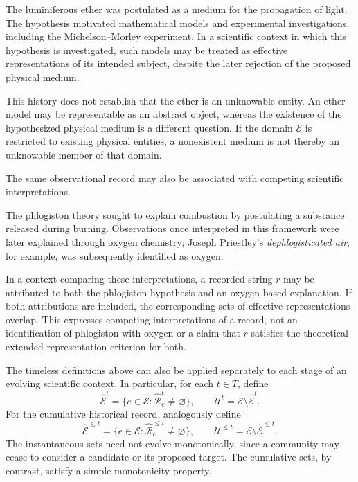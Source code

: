 \begin{example}
\label{ex:luminiferous_ether}
The luminiferous ether was postulated as a medium for the propagation of light. The hypothesis motivated mathematical models and experimental investigations, including the Michelson--Morley experiment. In a scientific context in which this hypothesis is investigated, such models may be treated as effective representations of its intended subject, despite the later rejection of the proposed physical medium.

This history does not establish that the ether is an unknowable entity. An ether model may be representable as an abstract object, whereas the existence of the hypothesized physical medium is a different question. If the domain $\mathcal E$ is restricted to existing physical entities, a nonexistent medium is not thereby an unknowable member of that domain.
\end{example}

The same observational record may also be associated with competing scientific interpretations.

\begin{example}
\label{ex:phlogiston}
The phlogiston theory sought to explain combustion by postulating a substance released during burning. Observations once interpreted in this framework were later explained through oxygen chemistry; Joseph Priestley's \emph{dephlogisticated air}, for example, was subsequently identified as oxygen.

In a context comparing these interpretations, a recorded string $r$ may be attributed to both the phlogiston hypothesis and an oxygen-based explanation. If both attributions are included, the corresponding sets of effective representations overlap. This expresses competing interpretations of a record, not an identification of phlogiston with oxygen or a claim that $r$ satisfies the theoretical extended-representation criterion for both.
\end{example}

The timeless definitions above can also be applied separately to each stage of an evolving scientific context. In particular, for each $t\in T$, define
\[
\hat{\mathcal E}^{t}
=\{e\in\mathcal E:\hat{\mathcal R}_e^{t}\neq\varnothing\},
\qquad
\mathcal U^{t}=\mathcal E\setminus\hat{\mathcal E}^{t}.
\]
For the cumulative historical record, analogously define
\[
\hat{\mathcal E}^{\leq t}
=\{e\in\mathcal E:\hat{\mathcal R}_e^{\leq t}\neq\varnothing\},
\qquad
\mathcal U^{\leq t}=\mathcal E\setminus\hat{\mathcal E}^{\leq t}.
\]
The instantaneous sets need not evolve monotonically, since a community may cease to consider a candidate or its proposed target. The cumulative sets, by contrast, satisfy a simple monotonicity property.


